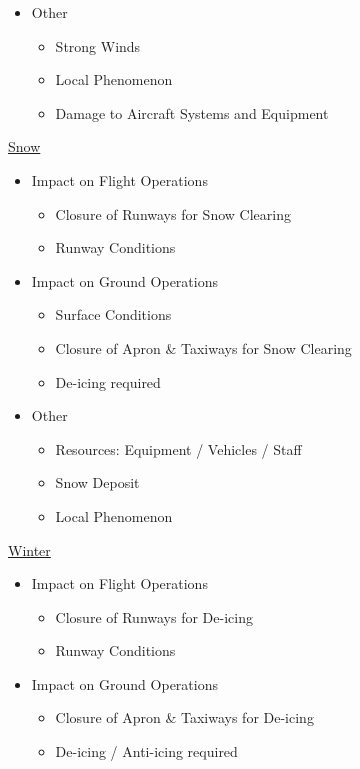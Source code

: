 \documentclass[9pt, landscape, fleqn]{scrartcl}
\begin{document}
\begin{multicols*}{3}
\begin{itemize}
\begin{itemize}
    \end{itemize}
    \item Other 
    \begin{itemize}
        \item Strong Winds
        \item Local Phenomenon
        \item Damage to Aircraft Systems and Equipment
    \end{itemize}
\end{itemize}
\underline{Snow}
\begin{itemize}
    \item Impact on Flight Operations 
    \begin{itemize}
        \item Closure of Runways for Snow Clearing
        \item Runway Conditions
    \end{itemize}
    \item Impact on Ground Operations
    \begin{itemize}
        \item Surface Conditions
        \item Closure of Apron \& Taxiways for Snow Clearing
        \item De-icing required
    \end{itemize} 
    \item Other 
    \begin{itemize}
        \item Resources: Equipment / Vehicles / Staff
        \item Snow Deposit
        \item Local Phenomenon
    \end{itemize}
\end{itemize}
\underline{Winter}
\begin{itemize}
    \item Impact on Flight Operations 
    \begin{itemize}
        \item Closure of Runways for De-icing
        \item Runway Conditions
    \end{itemize}
    \item Impact on Ground Operations
    \begin{itemize}
        \item Closure of Apron \& Taxiways for De-icing
        \item De-icing / Anti-icing required

\end{itemize}
\end{itemize}
\end{multicols*}
\end{document}
